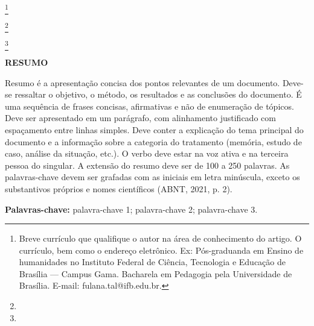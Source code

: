 \documentclass[a4paper, 12pt, twoside]{article}
\newcommand{\autor}{[Nome completo do(a) autor(a)]}
\newcommand{\orientador}{[Nome completo do(a) orientador(a), (se houver)]}
\newcommand{\coorientador}{[Nome completo do(a) coorientador(a), (se houver)]}
\begin{document}
\singlespacing %
\justifying %



\begin{flushright}

    \par \autor\footnote[*]{Breve currículo que qualifique o autor na área de conhecimento do artigo. O currículo, bem como o endereço eletrônico. Ex: Pós-graduanda em Ensino de humanidades no Instituto Federal de Ciência, Tecnologia e Educação de Brasília — Campus Gama. Bacharela em Pedagogia pela Universidade de Brasília. E-mail: fulana.tal@ifb.edu.br.}

    \par \orientador\footnote[**]{} 

    \par \coorientador\footnote[***]{} \medskip
    
\end{flushright}

\begin{center}

    \par \textbf{\MakeUppercase{Resumo}}
    
\end{center}

\noindent [OBRIGATÓRIO] Resumo é a apresentação concisa dos pontos relevantes de um documento. Deve-se ressaltar o objetivo, o método, os resultados e as conclusões do documento. É uma sequência de frases concisas, afirmativas e não de enumeração de tópicos. Deve ser apresentado em um parágrafo, com alinhamento justificado com espaçamento entre linhas simples. Deve conter a explicação do tema principal do documento e a informação sobre a categoria do tratamento (memória, estudo de caso, análise da situação, etc.). O verbo deve estar na voz ativa e na terceira pessoa do singular. A extensão do resumo deve ser de 100 a 250 palavras. As palavras-chave devem ser grafadas com as iniciais em letra minúscula, exceto os substantivos próprios e nomes científicos (ABNT, 2021, p. 2). \medskip

\noindent \textbf{Palavras-chave:} palavra-chave 1; palavra-chave 2; palavra-chave 3. \bigskip


\end{document}
